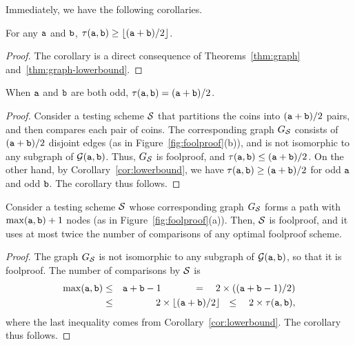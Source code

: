 Immediately, we have the following corollaries.

\begin{corollary} \label{cor:lowerbound}
For any $\mathtt{a}$ and $\mathtt{b}$, $\tau(\mathtt{a},\mathtt{b}) \geq \lfloor(\mathtt{a}+\mathtt{b})/2 \rfloor$.
\end{corollary}
\begin{proof}
The corollary is a direct consequence of Theorems~\ref{thm:graph} and~\ref{thm:graph-lowerbound}.
\end{proof}

\begin{corollary}
When $\mathtt{a}$ and $\mathtt{b}$ are both odd, $\tau(\mathtt{a},\mathtt{b})= (\mathtt{a}+\mathtt{b})/2$.
\end{corollary}
\begin{proof}
Consider a testing scheme ${\cal S}$ that partitions the coins into $(\mathtt{a}+\mathtt{b})/2$ pairs, and then compares each pair of coins.
The corresponding graph $G_{\cal S}$ consists of $(\mathtt{a}+\mathtt{b})/2$ disjoint edges (as in Figure~\ref{fig:foolproof}(b)), 
and is not isomorphic to any subgraph of ${\cal G}(\mathtt{a},\mathtt{b})$.  Thus, $G_{\cal S}$ is foolproof, and $\tau(\mathtt{a},\mathtt{b}) \leq (\mathtt{a}+\mathtt{b})/2$.  On the other hand, by Corollary~\ref{cor:lowerbound}, we have $\tau(\mathtt{a},\mathtt{b}) \geq (\mathtt{a}+\mathtt{b})/2$ for odd 
$\mathtt{a}$ and odd $\mathtt{b}$.  The corollary thus follows.
\end{proof}

\begin{corollary} 
Consider a testing scheme ${\cal S}$ whose corresponding graph $G_{\cal S}$ forms a path with $\max(\mathtt{a},\mathtt{b}) + 1$ nodes (as in Figure~\ref{fig:foolproof}(a)).  Then, ${\cal S}$ is foolproof, and it uses at most twice the number of comparisons 
of any optimal foolproof scheme.  
\end{corollary}
\begin{proof}
The graph $G_{\cal S}$ is not isomorphic to any subgraph of  ${\cal G}(\mathtt{a},\mathtt{b})$, so that it is foolproof.  The number of comparisons by ${\cal S}$ is 
\begin{eqnarray*}
\max(\mathtt{a},\mathtt{b}) &\leq& \mathtt{a} + \mathtt{b} - 1 \ \ \ \ \ \ \ \ \ \ =\ \ \ 2 \times ( (\mathtt{a} + \mathtt{b} - 1)/2 ) \\
&\leq& 2 \times \lfloor (\mathtt{a} + \mathtt{b})/ 2 \rfloor \ \ \leq\ \ \  2 \times \tau(\mathtt{a},\mathtt{b}),
\end{eqnarray*}
where the last inequality comes from Corollary~\ref{cor:lowerbound}.  The corollary thus follows.
\end{proof}